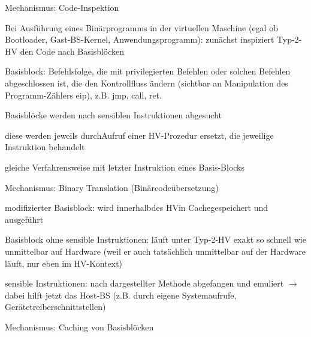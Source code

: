 \documentclass[a4paper]{article}
\begin{document}
\begin{multicols}{3}
    Mechanismus: Code-Inspektion

    \begin{itemize*}
        \item
        Bei Ausführung eines Binärprogramms in der virtuellen Maschine (egal
        ob Bootloader, Gast-BS-Kernel, Anwendungsprogramm): zunächst
        inspiziert Typ-2-HV den Code nach Basisblöcken
        \begin{itemize*}
            \item Basisblock: Befehlsfolge, die mit privilegierten Befehlen oder solchen Befehlen abgeschlossen ist, die den Kontrollfluss ändern (sichtbar an Manipulation des Programm-Zählers eip), z.B. jmp, call, ret.
        \end{itemize*}
        \item
        Basisblöcke werden nach sensiblen Instruktionen abgesucht
        \item
        diese werden jeweils durchAufruf einer HV-Prozedur ersetzt, die
        jeweilige Instruktion behandelt
        \item
        gleiche Verfahrensweise mit letzter Instruktion eines Basis-Blocks
    \end{itemize*}

    Mechanismus: Binary Translation (Binärcodeübersetzung)

    \begin{itemize*}
        \item
        modifizierter Basisblock: wird innerhalbdes HVin Cachegespeichert und
        ausgeführt
        \item
        Basisblock ohne sensible Instruktionen: läuft unter Typ-2-HV exakt so
        schnell wie unmittelbar auf Hardware (weil er auch tatsächlich
        unmittelbar auf der Hardware läuft, nur eben im HV-Kontext)
        \item
        sensible Instruktionen: nach dargestellter Methode abgefangen und
        emuliert $\rightarrow$  dabei hilft jetzt das Host-BS
        (z.B. durch eigene Systemaufrufe, Gerätetreiberschnittstellen)
    \end{itemize*}

    Mechanismus: Caching von Basisblöcken


\end{multicols}
\end{document}
